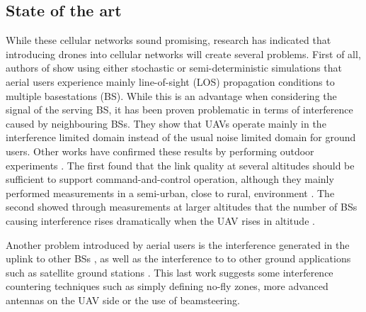 \documentclass[conference,twocolumn]{IEEEtran}
\begin{document}
\subsection{State of the art}
\par While these cellular networks sound promising, research has indicated that introducing drones into cellular networks will create several problems. First of all, authors of \cite{ Colpaert2018, Azari2018} show using either stochastic or semi-deterministic simulations that aerial users experience mainly line-of-sight (LOS) propagation conditions to multiple basestations (BS). While this is an advantage when considering the signal of the serving BS, it has been proven problematic in terms of interference caused by neighbouring BSs. They show that UAVs operate mainly in the interference limited domain instead of the usual noise limited domain for ground users. Other works have confirmed these results by performing outdoor experiments \cite{QualcommTechnologies2017, VanDerBergh2016}. The first found that the link quality at several altitudes should be sufficient to support command-and-control operation, although they mainly performed measurements in a semi-urban, close to rural, environment \cite{QualcommTechnologies2017}. The second showed through measurements at larger altitudes that the number of BSs causing interference rises dramatically when the UAV rises in altitude \cite{VanDerBergh2016}. 
\par Another problem introduced by aerial users is the interference generated in the uplink to other BSs \cite{VanDerBergh2016}, as well as the interference to to other ground applications such as satellite ground stations \cite{Vinogradov2019}. This last work suggests some interference countering techniques such as simply defining no-fly zones, more advanced antennas on the UAV side or the use of beamsteering.
\end{document}
